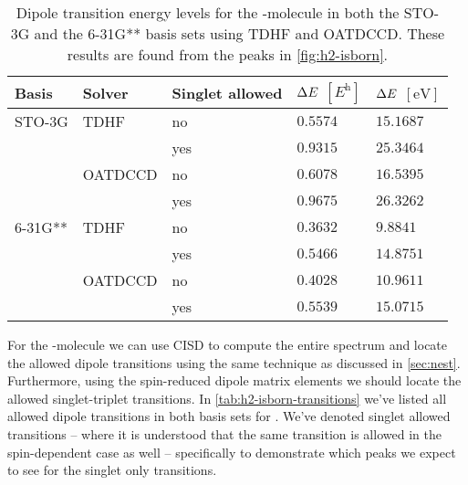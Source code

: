         \begin{table}
            \centering
            \caption{Dipole transition energy levels for the -molecule in
            both the STO-3G and the 6-31G** basis sets using TDHF and OATDCCD.
            These results are found from the peaks in \autoref{fig:h2-isborn}.}
            \renewcommand{\arraystretch}{1.3}
            \begin{tabular}{@{}lllll@{}}
                \toprule
                Basis & Solver & Singlet allowed
                & $\Delta E$ $[\si{\hartree}]$
                & $\Delta E$ $[\si{\electronvolt}]$
                \\
                \midrule
                STO-3G & TDHF & no & $0.5574$ & $15.1687$ \\
                & & yes & $0.9315$ & $25.3464$ \\
                & OATDCCD& no & $0.6078$ & $16.5395$ \\
                & & yes & $0.9675$ & $26.3262$ \\
                6-31G** & TDHF & no & $0.3632$ & $9.8841$ \\
                & & yes & $0.5466$ & $14.8751$ \\
                & OATDCCD & no & $0.4028$ & $10.9611$ \\
                & & yes & $0.5539$ & $15.0715$ \\
                \bottomrule
            \end{tabular}
            \label{tab:h2-isborn}
        \end{table}
        For the -molecule we can use CISD to compute the entire spectrum
        and locate the allowed dipole transitions using the same technique as
        discussed in \autoref{sec:nest}.
        Furthermore, using the spin-reduced dipole matrix elements we should
        locate the allowed singlet-triplet transitions.
        In \autoref{tab:h2-isborn-transitions} we've listed all allowed
        dipole transitions in both basis sets for .
        We've denoted singlet allowed transitions -- where it is understood that
        the same transition is allowed in the spin-dependent case as well --
        specifically to demonstrate which peaks we expect to see for the singlet
        only transitions.
